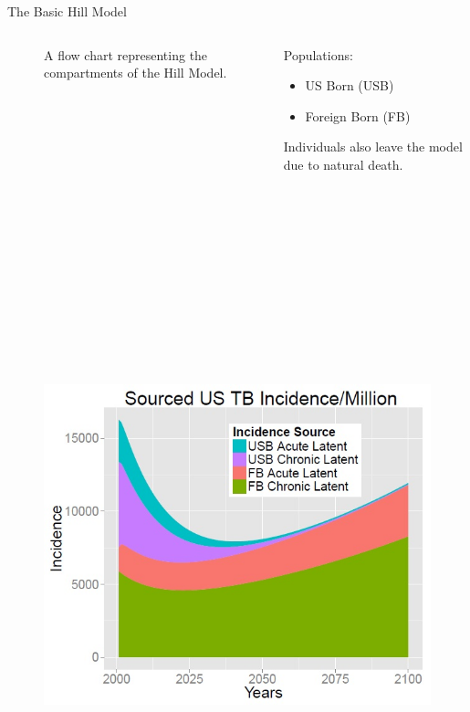 \documentclass[final]{beamer}
\begin{document}
\begin{frame}
\begin{columns}
\begin{column}{.3\textwidth}
\begin{block}{The Basic Hill Model}
\begin{columns}[T]
\begin{column}{.5\textwidth}
\begin{figure}[h]
\begin{center}
              \end{center}
              \caption{A flow chart representing the compartments of the Hill Model.}
              \label{fig:hillFlow}
            \end{figure}
          \end{column}
          \begin{column}{.43\textwidth}
            Populations:
            \begin{itemize}
              \item US Born (USB) 
              \item Foreign Born (FB)
            \end{itemize}
            Individuals also leave the model due to natural death.
          \end{column}
        \end{columns}
        \begin{figure}[h]
          \begin{center}
            \includegraphics[height=20cm] {newfig}%

\end{center}
\end{figure}
\end{block}
\end{column}
\end{columns}
\end{frame}
\end{document}
